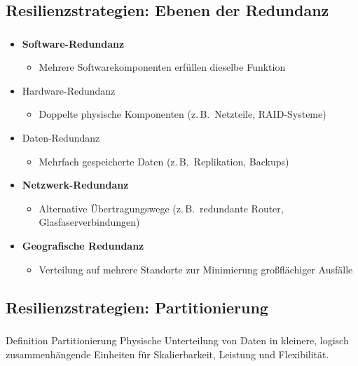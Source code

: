 \subsection{Resilienzstrategien: Ebenen der Redundanz}
\begin{frame}
    \frametitle{\insertsection}
    \framesubtitle{\insertsubsection}

        \begin{itemize}
            \item \textbf{Software-Redundanz}
            \begin{itemize}
                \item Mehrere Softwarekomponenten erfüllen dieselbe Funktion
            \end{itemize}
            \item Hardware-Redundanz
            \begin{itemize}
                \item Doppelte physische Komponenten (z.\,B.\ Netzteile, RAID-Systeme)
            \end{itemize}
            \item Daten-Redundanz
            \begin{itemize}
                \item Mehrfach gespeicherte Daten (z.\,B.\ Replikation, Backups)
            \end{itemize}
            \item \textbf{Netzwerk-Redundanz}
            \begin{itemize}
                \item Alternative Übertragungswege (z.\,B.\ redundante Router, Glasfaserverbindungen)
            \end{itemize}
            \item \textbf{Geografische Redundanz}
            \begin{itemize}
                \item Verteilung auf mehrere Standorte zur Minimierung großflächiger Ausfälle
            \end{itemize}
        \end{itemize}
\end{frame}

\subsection{Resilienzstrategien: Partitionierung}
\begin{frame}
    \frametitle{\insertsection}
    \framesubtitle{\insertsubsection}

    \begin{block}{Definition Partitionierung}
        Physische Unterteilung von Daten in kleinere, logisch zusammenhängende Einheiten für Skalierbarkeit, Leistung und Flexibilität.
    \end{block}
\end{frame}


